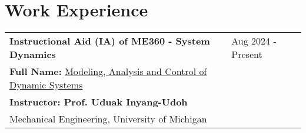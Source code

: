 \documentclass[letter,12pt]{article}
\begin{document}





\section{Work Experience}

\begin{tabularx}{\linewidth}{@{}l X@{}}
\large \textbf{Instructional Aid (IA) of ME360 - System Dynamics} & \hfill {Aug 2024 - Present} \\
\normalsize \textbf{Full Name:} \href{https://me.engin.umich.edu/wp-content/uploads/2023/07/ME-360-Course-Profile.pdf}{Modeling, Analysis and Control of Dynamic Systems} & \hfill \small{} \\
\small \textbf{Instructor: Prof. Uduak Inyang-Udoh} & \hfill \small{} \\
\normalsize{Mechanical Engineering, University of Michigan} & \hfill \small{} \\
\end{tabularx}
\end{document}
